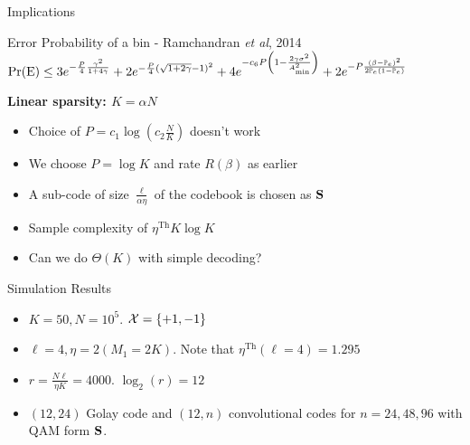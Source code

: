 \begin{frame}{Implications}
\begin{block}{Error Probability of a bin - Ramchandran \textit{et al}, 2014}
$\text{Pr(E)}\leq 3e^{-\frac{P}{4}\frac{\gamma^2}{1+4 \gamma}}+2e^{-\frac{P}{4}(\sqrt{1+2\gamma}-1)^2}+4e^{-c_6 P\left(1-\frac{2\gamma\sigma^2}{A^{2}_{\text{min}}}\right)}+2e^{-P\frac{\left(\beta-\mathbb{P}_{e}\right)^2}{2\mathbb{P}_{e}(1-\mathbb{P}_{e})}}$
\end{block}

\vspace{2ex}
\begin{description}
    \item [\textbf{Linear sparsity: $K=\alpha N$}]
\end{description}
\begin{itemize}
\item Choice of $P=c_{1}\log\left(c_2 \frac{N}{K}\right)$ doesn't work
\item We choose $P=\log K$ and rate $R(\beta)$ as earlier
\item A sub-code of size $\frac{\ell}{\alpha\eta}$ of the codebook is chosen as $\mathbf{S}$
\item Sample complexity of $\eta^{\text{Th}}K\log K$
\item Can we do $\Theta(K)$ with simple decoding?
\end{itemize}
\end{frame}

\begin{frame}{Simulation Results}
\begin{itemize}
\item $K=50, N=10^5$. $\mathcal{X}=\{+1,-1\}$
\item $\ell=4, \eta =2 (M_1 =2K)$. Note that $\eta^{\text{Th}}(\ell=4)=1.295$
\item $r=\frac{N\ell}{\eta K}=4000$. $\log_2(r)=12$
\item $(12,24)$ Golay code and $(12,n)$ convolutional codes for $n=24,48,96$ with QAM form $\mathbf{S}$.
\end{itemize}

\begin{figure}
\resizebox{0.5\textwidth}{!}{
\begin{centering}

\end{centering}
}
\end{figure}
\end{frame}